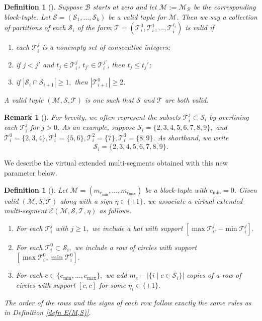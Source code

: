 \documentclass[11pt,letterpaper]{amsart}
\newcommand{\BB}{\mathcal{B}}
\newtheorem{defn}[thm]{Definition}
\newtheorem{rmk}[thm]{Remark}
\numberwithin{equation}{section}
\begin{document}
\begin{defn}[{\cite[Definition 5.9]{HKT26}}]
\label{valid T}
    Suppose $\BB$ starts at zero and let $\mathcal{M} := \mathcal{M}_\mathcal{B}$ be the corresponding block-tuple. Let $\mathcal{S} = (\mathcal{S}_1, \dots, \mathcal{S}_k)$ be a valid tuple for $\mathcal{M}$. Then we say a collection of partitions of each $\mathcal{S}_i$ of the form $\mathcal{T}=(\mathcal{T}_i^0, \mathcal{T}_i^1, \dots,  \mathcal{T}_i^{\ell_i})$ is \emph{valid} if
    \begin{enumerate}
        \item each $\mathcal{T}_i^j$ is a nonempty set of consecutive integers;
        \item if $j < j'$ and $t_j \in \mathcal{T}_i^j$, $t_{j'} \in \mathcal{T}_i^{j'}$, then $t_j \leq t_j'$;
        \item if $|\mathcal{S}_i \cap \mathcal{S}_{i + 1}| \geq 1,$ then $|\mathcal{T}_{i + 1}^0| \geq 2$.
    \end{enumerate}
A \emph{valid} tuple $(\mathcal{M}, \mathcal{S}, \mathcal{T})$ is one such that $\mathcal{S}$ and $\mathcal{T}$ are both valid.
\end{defn}

\begin{rmk}[{\cite[Remark 5.10]{HKT26}}]
    For brevity, we often represent the subsets $\mathcal{T}_i^j \subset \mathcal{S}_i$ by overlining each $\mathcal{T}_i^j$ for $j > 0$. As an example, suppose $\mathcal{S}_i = \{2, 3, 4, 5, 6, 7, 8, 9\},$ and $\mathcal{T}_i^0 = \{2, 3, 4\}, \mathcal{T}_i^1 = \{5, 6\}, \mathcal{T}_i^2 = \{7\}, \mathcal{T}_i^3 = \{8, 9\}.$ As shorthand, we write
    $$\mathcal{S}_i = \{2, 3, 4, \overline{5, 6}, \overline{7}, \overline{8, 9}\}.$$
\end{rmk}

We describe the virtual extended multi-segments obtained with this new parameter below.

\begin{defn}[{\cite[Definition 5.11]{HKT26}}]
\label{defn E(M,S, T)}
    Let $\mathcal{M} = (m_{c_{\min}}, \dots, m_{c_{\max}})$ be a block-tuple with $c_{\min} = 0$. Given valid $(\mathcal{M}, \mathcal{S}, \mathcal{T})$ along with a sign $\eta \in \{\pm 1\}$, we associate a virtual extended multi-segment $\mathcal{E}(\mathcal{M}, \mathcal{S}, \mathcal{T}, \eta)$ as follows.
\begin{enumerate}
    \item For each $\mathcal{T}_i^j$ with $j \geq 1,$ we include a hat with support
    $[\max \mathcal{T}_i^j, -\min \mathcal{T}_i^j].$
    \item For each $\mathcal{T}_i^0 \subset \mathcal{S}_i,$ we include a row of circles with support
    $[\max \mathcal{T}_i^0, \min \mathcal{T}_i^0].$
    \item For each $c \in \{c_{\min}, \dots, c_{\max}\},$ we add $m_c - |\{i \mid c \in \mathcal{S}_i\}|$ copies of a row of circles with support
    $[c, c]$
    for some $\eta_i \in\{\pm 1\}.$
\end{enumerate}
The order of the rows and the signs of each row follow exactly the same rules as in Definition \ref{defn E(M,S)}.
\end{defn}
\end{document}
